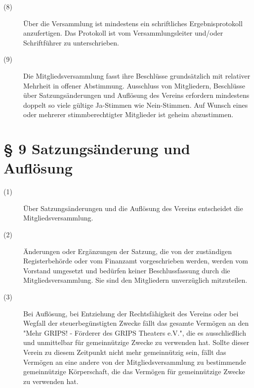 \documentclass[a4paper,12pt]{scrartcl}
\begin{document}
\begin{description}
\item[(8)] Über die Versammlung ist mindestens ein schriftliches Ergebnisprotokoll anzufertigen. Das Protokoll ist vom Versammlungsleiter und/oder Schriftführer zu unterschrieben.
\item[(9)] Die Mitgliedsversammlung fasst ihre Beschlüsse grundsätzlich mit relativer Mehrheit in offener Abstimmung. Ausschluss von Mitgliedern, Beschlüsse über Satzungsänderungen und Auflösung des Vereins erfordern mindestens doppelt so viele gültige Ja-Stimmen wie Nein-Stimmen. Auf Wunsch eines oder mehrerer stimmberechtigter Mitglieder ist geheim abzustimmen.

\end{description}


\section*{\S{} 9 Satzungsänderung und Auflösung}
\begin{description} 

\item[(1)] Über Satzungsänderungen und die Auflösung des Vereins entscheidet die Mitgliedsversammlung.
\item[(2)] Änderungen oder Ergänzungen der Satzung, die von der zuständigen Registerbehörde oder vom Finanzamt vorgeschrieben werden, werden vom Vorstand umgesetzt und bedürfen keiner Beschlussfassung durch die Mitgliedsversammlung. Sie sind den Mitgliedern unverzüglich mitzuteilen.
\item[(3)] Bei Auflösung, bei Entziehung der Rechtsfähigkeit des Vereins oder bei Wegfall der steuerbegünstigten Zwecke fällt das gesamte Vermögen an den "Mehr GRIPS! - Förderer des GRIPS Theaters e.V.", die es ausschließlich und unmittelbar für gemeinnützige Zwecke zu verwenden hat. Sollte dieser Verein zu diesem Zeitpunkt nicht mehr gemeinnützig sein, fällt das Vermögen an eine andere von der Mitgliedsversammlung zu bestimmende gemeinnützige Körperschaft, die das Vermögen für gemeinnützige Zwecke zu verwenden hat.

\end{description}
\end{document}
